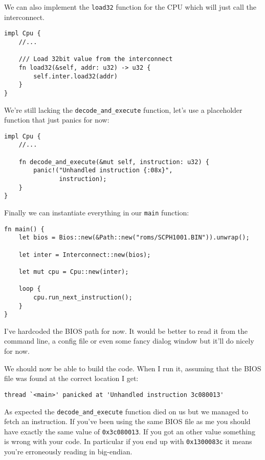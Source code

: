 \documentclass[a4paper]{article}
\newcommand{\code}[1] {\texttt{#1}}
\begin{document}
We can also implement the \code{load32} function for the CPU which
will just call the interconnect.

\begin{lstlisting}
impl Cpu {
    //...

    /// Load 32bit value from the interconnect
    fn load32(&self, addr: u32) -> u32 {
        self.inter.load32(addr)
    }
}
\end{lstlisting}

We're still lacking the \code{decode\_and\_execute} function, let's use a
placeholder function that just panics for now:

\begin{lstlisting}
impl Cpu {
    //...

    fn decode_and_execute(&mut self, instruction: u32) {
        panic!("Unhandled instruction {:08x}",
               instruction);
    }
}
\end{lstlisting}

Finally we can instantiate everything in our \code{main} function:

\begin{lstlisting}
fn main() {
    let bios = Bios::new(&Path::new("roms/SCPH1001.BIN")).unwrap();

    let inter = Interconnect::new(bios);

    let mut cpu = Cpu::new(inter);

    loop {
        cpu.run_next_instruction();
    }
}
\end{lstlisting}

I've hardcoded the BIOS path for now. It would be better to read it
from the command line, a config file or even some fancy dialog window
but it'll do nicely for now.

We should now be able to build the code. When I run it, assuming that
the BIOS file was found at the correct location I get:

\begin{verbatim}
thread `<main>' panicked at 'Unhandled instruction 3c080013'
\end{verbatim}

As expected the \code{decode\_and\_execute} function died on us but
we managed to fetch an instruction. If you've been using the same BIOS
file as me you should have exactly the same value of
\code{0x3c080013}. If you got an other value something is wrong with
your code. In particular if you end up with \code{0x1300083c} it
means you're erroneously reading in big-endian.
\end{document}

